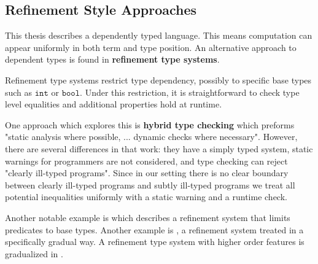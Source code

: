 \subsection{Refinement Style Approaches}
 
This thesis describes a \fullSp{} dependently typed language.
This means computation can appear uniformly in both term and type position.
An alternative approach to dependent types is found in \textbf{refinement type systems}.
 
Refinement type systems restrict type dependency, possibly to specific base types such as $\mathtt{int}$ or $\mathtt{bool}$.
Under this restriction, it is straightforward to check type level equalities and additional properties hold at runtime.
 
One approach which explores this is \textbf{hybrid type checking} \cite{10.1145/1111037.1111059,10.1145/1667048.1667051} which preforms "static analysis where possible, ... dynamic checks where necessary".
However, there are several differences in that work: they have a simply typed system, static warnings for programmers are not considered, and type checking can reject "clearly ill-typed programs".
Since in our setting there is no clear boundary between clearly ill-typed programs and subtly ill-typed programs we treat all potential inequalities uniformly with a static warning and a runtime check.


Another notable example is \cite{10.1007/1-4020-8141-3_34} which describes a refinement system that limits predicates to base types.
Another example is \cite{10.1145/3093333.3009856}, a refinement system treated in a specifically gradual way.
A refinement type system with higher order features is gradualized in \cite{c4be73a0daf74c9aa4d13483a2c4dd0e}.
 
 
